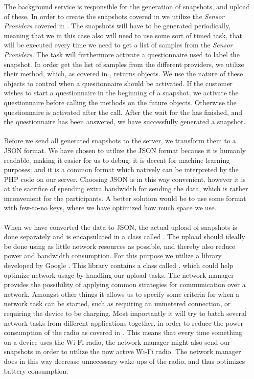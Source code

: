 The background service is responsible for the generation of snapshots, and upload of these. In order to create the snapshots covered in  we utilize the \emph{Sensor Providers} covered in . The snapshots will have to be generated periodically, meaning that we in this case also will need to use some sort of timed task, that will be executed every time we need to get a list of samples from the \emph{Sensor Providers}. The task will furthermore activate a questionnaire used to label the snapshot. In order get the list of samples from the different providers, we utilize their  method, which, as covered in , returns  objects. We use the nature of these objects to control when a quesitonnaire should be activated. If the customer wishes to start a questionnaire in the beginning of a snapshot, we activate the questionnaire before calling the  methods on the future objects. Otherwise the questionnaire is activated after the call. After the wait for the  has finished, and the questionnaire has been answered, we have successfully generated a snapshot.
\\\\
Before we send all generated snapshots to the server, we transform them to a JSON format. We have chosen to utilize the JSON format because it is humanly readable, making it easier for us to debug; it is decent for machine learning purposes; and it is a common format which natively can be interpreted by the PHP code on our server. Choosing JSON is in this way convenient, however it is at the sacrifice of spending extra bandwidth for sending the data, which is rather inconvenient for the participants. A better solution would be to use some format with few-to-no keys, where we have optimized how much space we use. 
\\\\
When we have converted the data to JSON, the actual upload of snapshots is done separately and is encapsulated in a class called . The upload should ideally be done using as little network resources as possible, and thereby also reduce power and bandwidth consumption. For this purpose we utilize a library developed by Google \parencite{gcmnetworkmanager}. This library contains a class called , which could help optimize network usage by handling our upload tasks. The network manager provides the possibility of applying common strategies for communication over a network. Amongst other things it allows us to specify some criteria for when a network task can be started, such as requiring an unmetered connection, or requiring the device to be charging. Most importantly it will try to batch several network tasks from different applications together, in order to reduce the power consumption of the radio as covered in . This means that every time something on a device uses the Wi-Fi radio, the network manager might also send our snapshots in order to utilize the now active Wi-Fi radio. The network manager does in this way decrease unnecessary wake-ups of the radio, and thus optimizes battery consumption.
